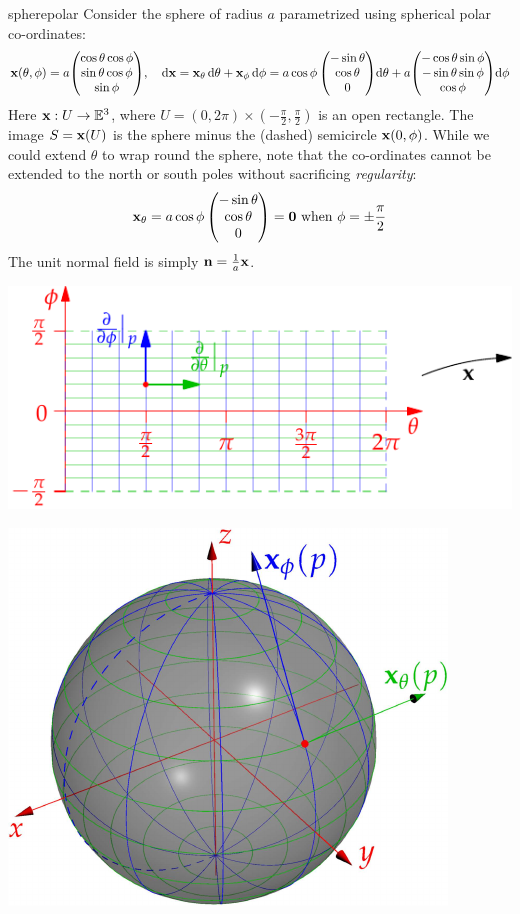 \begin{example}{}{spherepolar}
Consider the sphere of radius $a$ parametrized using spherical polar co-ordinates:
	\[{\mathbf{x}}(\theta,\phi)=a\!\begin{pmatrix}\cos\theta\cos\phi\\\sin\theta\cos\phi\\\sin\phi\end{pmatrix}\!,\quad \mathrm{d}{\mathbf{x}}={\mathbf{x}}_\theta\,{\mathrm{d}\theta}+{\mathbf{x}}_\phi\,\mathrm{d}\phi =a\cos\phi\begin{pmatrix}-\sin\theta\\\cos\theta\\0\end{pmatrix}\!{\mathrm{d}\theta}+a\!\begin{pmatrix}-\cos\theta\sin\phi\\-\sin\theta\sin\phi\\\cos\phi\end{pmatrix}\!\mathrm{d}\phi\]
	Here ${\mathbf{x}}:U\to\mathbb{E}^3$, where $U=(0,2\pi)\times(-\frac\pi 2,\frac\pi 2)$ is an open rectangle. The image $S={\mathbf{x}}(U)$ is the sphere minus the (dashed) semicircle ${\mathbf{x}}(0,\phi)$. While we could extend $\theta$ to wrap round the sphere, note that the co-ordinates cannot be extended to the north or south poles without sacrificing \emph{regularity}:
	\[{\mathbf{x}}_\theta=a\cos\phi\begin{pmatrix}-\sin\theta\\\cos\theta\\0\end{pmatrix}=\mathbf{0}\text{ when }\phi=\pm\frac\pi 2\]
	The unit normal field is simply ${\mathbf{n}}=\frac 1a{\mathbf{x}}$.\par
	\begin{minipage}{0.55\linewidth}\vspace{10pt}
	\includegraphics{surfaces-sphere2}
	\end{minipage}\hfill\begin{minipage}{0.44\linewidth}\vspace{-55pt}
	\flushright\href{http://www.math.uci.edu/~ndonalds/math162a/surfaces-sphere.html}{\includegraphics{surfaces-sphere}}

\end{minipage}
\end{example}

